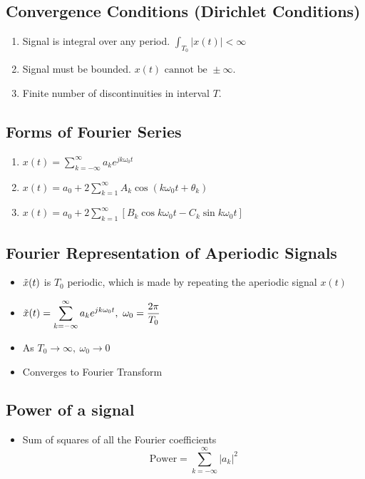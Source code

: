 \documentclass[a4paper]{article}
\begin{document}
\subsection{Convergence Conditions (Dirichlet Conditions)}
\begin{enumerate}
    \item Signal is integral over any period. \quad $\displaystyle \int_{T_0}|x(t)|<\infty$
    \item Signal must be bounded. \quad $x(t) \text{ cannot be }\pm\infty.$
    \item Finite number of discontinuities in interval $T$.
\end{enumerate}
\subsection{Forms of Fourier Series}
\begin{enumerate}
    \item $\displaystyle x(t) =\sum_{k=-\infty}^{\infty}a_k e^{jk\omega_0 t}$
    \item $\displaystyle x(t) = a_0 + 2\sum_{k=1}^{\infty}A_k\cos(k\omega_0 t+\theta_k)$
    \item $\displaystyle x(t) = a_0 + 2\sum_{k=1}^{\infty}[B_k\cos k\omega_0 t-C_k\sin k\omega_0 t]$
\end{enumerate}
\subsection{Fourier Representation of Aperiodic Signals}
\begin{itemize}
    \item $\Tilde{x}(t)$ is $T_0$ periodic, which is made by repeating the aperiodic signal $x(t)$
    \item $\displaystyle \Tilde{x}(t) = \sum_{k=-\infty}^{\infty}a_k e^{jk\omega_0 t}, \ \omega_0 = \frac{2\pi}{T_0}$
    \item As $T_0 \rightarrow \infty,\ \omega_0 \rightarrow 0$
    \item Converges to Fourier Transform
\end{itemize}
\subsection{Power of a signal}
\begin{itemize}
    \item Sum of squares of all the Fourier coefficients
    $$\text{Power} = \sum_{k=-\infty}^{\infty}|a_k|^2$$
\end{itemize}
\end{document}
